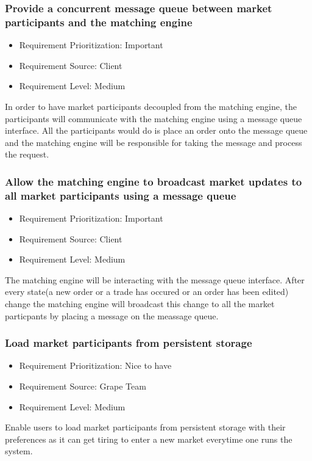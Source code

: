 \documentclass[12pt]{article}
\begin{document}
			\subsubsection{Provide a concurrent message queue between market participants and the matching engine}
			\begin{itemize}
				\item Requirement Prioritization: Important
				\item Requirement Source: Client 
				\item Requirement Level: Medium	
			\end{itemize}
			In order to have market participants decoupled from the matching engine,  the participants will communicate with the matching engine using a message queue interface. All the participants would do is place an order onto the message queue and the matching engine will be responsible for taking the message and process the request.
			
			\subsubsection{Allow the matching engine to broadcast market updates to all market participants using a message queue}
			\begin{itemize}
				\item Requirement Prioritization: Important
				\item Requirement Source: Client 
				\item Requirement Level: Medium	
			\end{itemize}
			The matching engine will be interacting with the message queue interface. After every state(a new order or a trade has occured or an order has been edited) change the matching engine will broadcast this change to all the market particpants by placing a message on the meassage queue.
			
			\subsubsection{Load market participants from persistent storage}
			\begin{itemize}
				\item Requirement Prioritization: Nice to have
				\item Requirement Source: Grape Team 
				\item Requirement Level: Medium	
			\end{itemize}
			Enable users to load market participants from persistent storage with their preferences as it can get tiring to enter a new market everytime one runs the system. 
			
\end{document}
